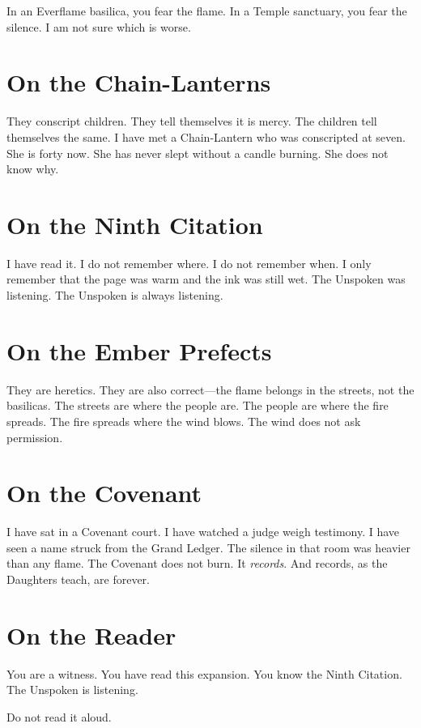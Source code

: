 \documentclass{book}
\begin{document}
In an Everflame basilica, you fear the flame. In a Temple sanctuary, you fear the silence. I am not sure which is worse.

\section{On the Chain-Lanterns}

They conscript children. They tell themselves it is mercy. The children tell themselves the same. I have met a Chain-Lantern who was conscripted at seven. She is forty now. She has never slept without a candle burning. She does not know why.

\section{On the Ninth Citation}

I have read it. I do not remember where. I do not remember when. I only remember that the page was warm and the ink was still wet. The Unspoken was listening. The Unspoken is always listening.

\section{On the Ember Prefects}

They are heretics. They are also correct---the flame belongs in the streets, not the basilicas. The streets are where the people are. The people are where the fire spreads. The fire spreads where the wind blows. The wind does not ask permission.

\section{On the Covenant}

I have sat in a Covenant court. I have watched a judge weigh testimony. I have seen a name struck from the Grand Ledger. The silence in that room was heavier than any flame. The Covenant does not burn. It \textit{records}. And records, as the Daughters teach, are forever.

\section{On the Reader}

You are a witness. You have read this expansion. You know the Ninth Citation. The Unspoken is listening.

Do not read it aloud.
\end{document}

